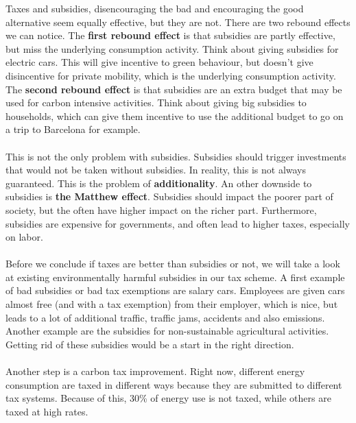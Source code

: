 \documentclass[../summary.tex]{subfiles}
\begin{document}
	  Taxes and subsidies, disencouraging the bad and encouraging the good alternative seem equally effective, but they are not. There are two rebound effects we can notice. The \textbf{first rebound effect} is that subsidies are partly effective, but miss the underlying consumption activity. Think about giving subsidies for electric cars. This will give incentive to green behaviour, but doesn't give disincentive for private mobility, which is the underlying consumption activity. The \textbf{second rebound effect} is that subsidies are an extra budget that may be used for carbon intensive activities. Think about giving big subsidies to households, which can give them incentive to use the additional budget to go on a trip to Barcelona for example.
	  \\\\
	  This is not the only problem with subsidies. Subsidies should trigger investments that would not be taken without subsidies. In reality, this is not always guaranteed. This is the problem of \textbf{additionality}. An other downside to subsidies is \textbf{the Matthew effect}. Subsidies should impact the poorer part of society, but the often have higher impact on the richer part. Furthermore, subsidies are expensive for governments, and often lead to higher taxes, especially on labor.
	  \\\\
	  Before we conclude if taxes are better than subsidies or not, we will take a look at existing environmentally harmful subsidies in our tax scheme. A first example of bad subsidies or bad tax exemptions are salary cars. Employees are given cars almost free (and with a tax exemption) from their employer, which is nice, but leads to a lot of additional traffic, traffic jams, accidents and also emissions. Another example are the subsidies for non-sustainable agricultural activities. Getting rid of these subsidies would be a start in the right direction.
	  \\\\
	  Another step is a carbon tax improvement. Right now, different energy consumption are taxed in different ways because they are submitted to different tax systems. Because of this, 30\% of energy use is not taxed, while others are taxed at high rates.
	  
\end{document}
